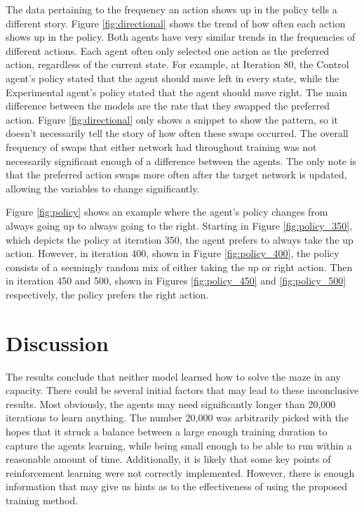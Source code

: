 \documentclass[12pt,letterpaper]{article}
\begin{document}
The data pertaining to the frequency an action shows up in the policy tells a different story.
Figure \ref{fig:directional} shows the trend of how often each action shows up in the policy.
Both agents have very similar trends in the frequencies of different actions.
Each agent often only selected one action as the preferred action, regardless of the current state.
For example, at Iteration 80, the Control agent's policy stated that the agent should move left in every state, while the Experimental agent's policy stated that the agent should move right.
The main difference between the models are the rate that they swapped the preferred action.
Figure \ref{fig:directional} only shows a snippet to show the pattern, so it doesn't necessarily tell the story of how often these swaps occurred.
The overall frequency of swaps that either network had throughout training was not necessarily significant enough of a difference between the agents.
The only note is that the preferred action swaps more often after the target network is updated, allowing the variables to change significantly.

Figure \ref{fig:policy} shows an example where the agent's policy changes from always going up to always going to the right.
Starting in Figure \ref{fig:policy_350}, which depicts the policy at iteration 350, the agent prefers to always take the up action.
However, in iteration 400, shown in Figure \ref{fig:policy_400}, the policy consists of a seemingly random mix of either taking the up or right action.
Then in iteration 450 and 500, shown in Figures \ref{fig:policy_450} and \ref{fig:policy_500} respectively, the policy prefers the right action.

\section{Discussion}

The results conclude that neither model learned how to solve the maze in any capacity.
There could be several initial factors that may lead to these inconclusive results.
Most obviously, the agents may need significantly longer than 20,000 iterations to learn anything.
The number 20,000 was arbitrarily picked with the hopes that it struck a balance between a large enough training duration to capture the agents learning, while being small enough to be able to run within a reasonable amount of time.
Additionally, it is likely that some key points of reinforcement learning were not correctly implemented.
However, there is enough information that may give us hints as to the effectiveness of using the proposed training method.
\end{document}
